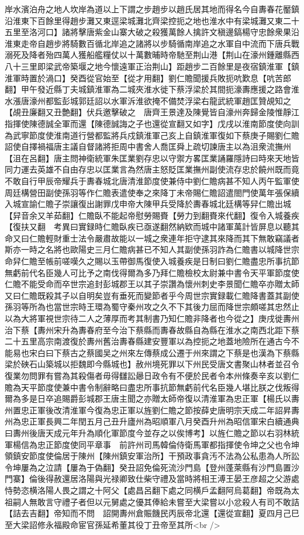 岸水濱泊舟之地人坎岸為道以上下謂之步趙步以趙氏居其地而得名今自夀春花靨鎮沿淮東下百餘里得趙步灘又東逕梁城灘北齊梁控扼之地也淮水中有梁城灘又東二十五里至洛河口】諸將擊唐紫金山寨大破之殺獲萬餘人擒許文稹邊鎬楊守忠餘衆果沿淮東走帝自趙步將騎數百循北岸追之諸將以步騎循南岸追之水軍自中流而下唐兵戰溺死及降者殆四萬人獲船艦糧仗以十萬數晡時帝馳至荆山港【荆山在濠州鍾離縣西八十三里即梁武帝築堰之地今懷遠軍正治荆山】距趙步二百餘里是夜宿鎮淮軍【鎮淮軍時置於渦口】癸酉從官始至【從才用翻】劉仁贍聞援兵敗扼吭歎息【吭苦郎翻】甲午發近縣丁夫城鎮淮軍為二城夾淮水徙下蔡浮梁於其間扼濠夀應援之路會淮水漲唐濠州都監彭城郭廷詔以水軍泝淮欲掩不備焚浮梁右龍武統軍趙匡贊覘知之【覘丑廉翻又丑艶翻】伏兵邀擊破之　唐齊王景達及陳覺皆自濠州奔歸金陵惟靜江指揮使陳德誠全軍而還【陳德誠誨之子也還從宣翻又如字】戊戌以淮南節度使向訓為武寧節度使淮南道行營都監將兵戍鎮淮軍己亥上自鎮淮軍復如下蔡庚子賜劉仁贍詔使自擇禍福唐主議自督諸將拒周中書舍人喬匡舜上疏切諫唐主以為沮衆流撫州【沮在呂翻】唐主問神衛統軍朱匡業劉存忠以守禦方畧匡業誦羅隱詩曰時來天地皆同力運去英雄不自由存忠以匡業言為然唐主怒貶匡業撫州副使流存忠於饒州既而竟不敢自行甲辰帝耀兵于夀春城北唐清淮節度使兼侍中劉仁贍病甚不知人丙午監軍使周廷構營田副使孫羽等作仁贍表遣使奉之來降丁未帝賜仁贍詔遣閤門使萬年張保續入城宣諭仁贍子崇讓復出謝罪戊申帝大陳甲兵受降於夀春城北廷構等舁仁贍出城【舁音余又羊茹翻】仁贍臥不能起帝慰勞賜賚【勞力到翻賚來代翻】復令入城養疾【復扶又翻　考異曰實録時仁贍臥疾已亟遂翻然納欵而城中諸軍萬計皆屏息以聽其命又曰仁贍輕財重士法令嚴肅故能以一城之衆連年拒守逮其來降而其下無敢竊議者斯亦一時之名將也歐陽史三月仁贍病甚已不知人其副使孫羽詐為仁贍書以城降世宗命舁仁贍至帳前嗟嘆久之賜以玉帶御馬復使入城養疾是日制曰劉仁贍盡忠所事抗節無虧前代名臣幾人可比予之南伐得爾為多乃拜仁贍檢校太尉兼中書令天平軍節度使仁贍不能受命而卒世宗追封彭城郡王以其子崇讚為懷州刺史李景聞仁贍卒亦贈太師又曰仁贍既殺其子以自明矣豈有垂死而變節者乎今周世宗實録載仁贍降書蓋其副使孫羽等所為也當世宗時王環為蜀守秦州攻之久不下其後力屈而降世宗頗嗟其忠然止以為大將軍視世宗待二人之薄厚而考其制書乃知仁贍非降者也今從之】庚戌徙夀州治下蔡【夀州宋升為夀春府至今治下蔡縣而夀春故縣自為縣在淮水之南西北距下蔡二十五里高宗南渡復於夀州舊治夀春縣建安豐軍以為控扼之地蓋地險所在通古今不能易也宋白曰下蔡古之蔡國吴之州來左傳蔡成公遷于州來謂之下蔡是也漢為下蔡縣梁於硤石山築城以拒魏即今縣城也】赦州境死罪以下州民受唐文書聚山林者並召令復業勿問罪有嘗為其殺傷者毋得讎訟曏日政令有不便於民者令本州條奏辛亥以劉仁贍為天平節度使兼中書令制辭略曰盡忠所事抗節無虧前代名臣幾人堪比朕之伐叛得爾為多是日卒追賜爵彭城郡王唐主聞之亦贈太師帝復以清淮軍為忠正軍【楊氏以夀州置忠正軍後改清淮軍今復為忠正軍以旌劉仁贍之節按薛史唐明宗天成二年詔昇夀州為忠正軍長興二年閏五月己丑升廬州為昭順軍八月癸酉升州為昭信軍宋白續通典曰夀州後唐天成元年升為順化軍節度今並存之以俟博考】以旌仁贍之節以右羽林統軍楊信為忠正節度使同平章事　前許州司馬韓倫侍衛馬軍都指揮使令坤之父也令坤領鎮安節度使倫居于陳州【陳州鎮安軍治所】干預政事貪汚不法為公私患為人所訟令坤屢為之泣請【屢為于偽翻】癸丑詔免倫死流沙門島【登州蓬萊縣有沙門島置沙門寨】倫後得赦還居洛陽與光禄卿致仕柴守禮及當時將相王溥王晏王彦超之父游處恃勢恣横洛陽人畏之謂之十阿父【處昌呂翻下處之同横戶孟翻阿烏葛翻】帝既為太祖嗣人無敢言守禮子者但以元舅處之優其俸給未嘗至大梁嘗以小忿殺人有司不敢詰【詰去吉翻】帝知而不問　詔開夀州倉賑饑民丙辰帝北還【還從宣翻】夏四月己巳至大梁詔修永福殿命宦官孫延希董其役丁丑帝至其所<br />
